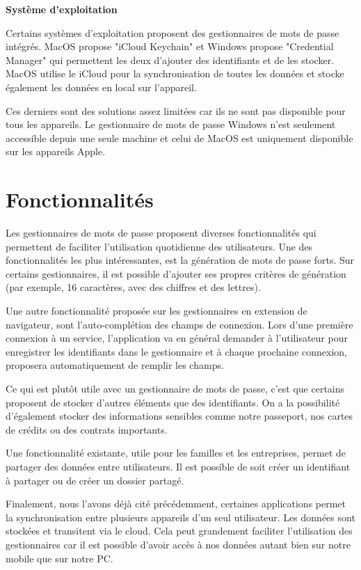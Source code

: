 \textbf{Système d'exploitation}

Certains systèmes d'exploitation proposent des gestionnaires de mots de passe intégrés. MacOS propose "iCloud Keychain" et Windows propose "Credential Manager" qui permettent les deux d'ajouter des identifiants et de les stocker. MacOS utilise le iCloud pour la synchronisation de toutes les données et stocke également les données en local sur l'appareil.

Ces derniers sont des solutions assez limitées car ils ne sont pas disponible pour tous les appareils. Le gestionnaire de mots de passe Windows n'est seulement accessible depuis une seule machine et celui de MacOS est uniquement disponible sur les appareils Apple. 

\section{Fonctionnalités}
\label{intro}

Les gestionnaires de mots de passe proposent diverses fonctionnalités qui permettent de faciliter l'utilisation quotidienne des utilisateurs. Une des fonctionnalités les plus intéressantes, est la génération de mots de passe forts. Sur certains gestionnaires, il est possible d'ajouter ses propres critères de génération (par exemple, 16 caractères, avec des chiffres et des lettres).

Une autre fonctionnalité proposée sur les gestionnaires en extension de navigateur, sont l'auto-complétion des champs de connexion. Lors d'une première connexion à un service, l'application va en général demander à l'utilisateur pour enregistrer les identifiants dans le gestionnaire et à chaque prochaine connexion, proposera automatiquement de remplir les champs.

Ce qui est plutôt utile avec un gestionnaire de mots de passe, c'est que certains proposent de stocker d'autres éléments que des identifiants. On a la possibilité d'également stocker des informations sensibles comme notre passeport, nos cartes de crédits ou des contrats importants. 

Une fonctionnalité existante, utile pour les familles et les entreprises, permet de partager des données entre utilisateurs. Il est possible de soit créer un identifiant à partager ou de créer un dossier partagé. 

Finalement, nous l'avons déjà cité précédemment, certaines applications permet la synchronisation entre plusieurs appareils d'un seul utilisateur. Les données sont stockées et transitent via le cloud. Cela peut grandement faciliter l'utilisation des gestionnaires car il est possible d'avoir accès à nos données autant bien sur notre mobile que sur notre PC.

